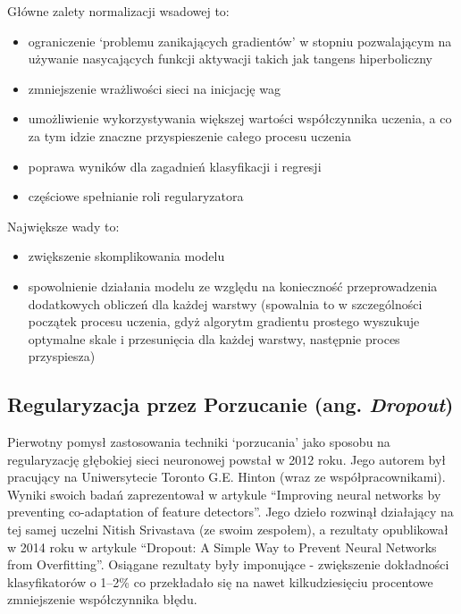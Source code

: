 \documentclass[a4paper,11pt]{article}
\begin{document}
    \bigskip

    Główne zalety normalizacji wsadowej to\cite{UczenieMaszynowe2018}:
    \begin{itemize}
        \item ograniczenie `problemu zanikających gradientów' w stopniu pozwalającym na używanie nasycających funkcji aktywacji takich jak tangens hiperboliczny
        \item zmniejszenie wrażliwości sieci na inicjację wag
        \item umożliwienie wykorzystywania większej wartości współczynnika uczenia, a co za tym idzie znaczne przyspieszenie całego procesu uczenia
        \item poprawa wyników dla zagadnień klasyfikacji i regresji
        \item częściowe spełnianie roli regularyzatora
    \end{itemize}

    \bigskip

    Największe wady to\cite{UczenieMaszynowe2018}:
    \begin{itemize}
        \item zwiększenie skomplikowania modelu
        \item spowolnienie działania modelu ze względu na konieczność przeprowadzenia dodatkowych obliczeń dla każdej warstwy (spowalnia to w szczególności początek procesu uczenia, gdyż algorytm gradientu prostego wyszukuje optymalne skale i przesunięcia dla każdej warstwy, następnie proces przyspiesza)
    \end{itemize}

    \subsection{Regularyzacja przez Porzucanie (ang. \textit{Dropout})}

    Pierwotny pomysł zastosowania techniki `porzucania' jako sposobu na regularyzację głębokiej sieci neuronowej powstał w 2012 roku. Jego autorem był pracujący na Uniwersytecie Toronto G.E. Hinton (wraz ze współpracownikami). Wyniki swoich badań zaprezentował w artykule ``Improving neural networks by preventing co-adaptation of feature detectors''\cite{ImprovingNeuralNetworks2012}. Jego dzieło rozwinął działający na tej samej uczelni Nitish Srivastava (ze swoim zespołem), a rezultaty opublikował w 2014 roku w artykule ``Dropout: A Simple Way to Prevent Neural Networks from Overfitting''\cite{Dropout2014}. Osiągane rezultaty były imponujące - zwiększenie dokładności klasyfikatorów o 1--2\% co przekładało się na nawet kilkudziesięciu procentowe zmniejszenie współczynnika błędu.
\end{document}
